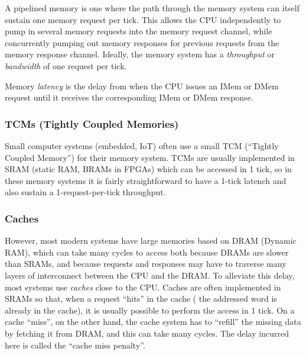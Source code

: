 A pipelined memory is one where the path through the memory system can
itself sustain one memory request per tick.  This allows the CPU
independently to pump in several memory requests into the memory
request channel, while concurrently pumping out memory responses for
previous requests from the memory response channel.  Ideally, the
memory system has a \emph{throughput} or \emph{bandwidth} of one
request per tick.

Memory \emph{latency} is the delay from when the CPU issues an IMem or
DMem request until it receives the corresponding IMem or DMem
response.


\subsubsection{TCMs (Tightly Coupled Memories)}




Small computer systems (embedded, IoT) often use a small TCM
(``Tightly Coupled Memory'') for their memory system.  TCMs are
usually implemented in SRAM (static RAM, BRAMs in FPGAs) which can be
accessed in 1 tick, so in these memory systems it is fairly
straightforward to have a 1-tick latench and also sustain a
1-request-per-tick throughput.


\subsubsection{Caches}



However, most modern systems have large memories based on DRAM
(Dynamic RAM), which can take many cycles to access both because DRAMs
are slower than SRAMs, and because requests and responses may have to
traverse many layers of interconnect between the CPU and the DRAM.  To
alleviate this delay, most systems use \emph{caches} close to the CPU.
Caches are often implemented in SRAMs so that, when a request ``hits''
in the cache ({\ie} the addressed word is already in the cache), it is
usually possible to perform the access in 1 tick.  On a cache
``miss'', on the other hand, the cache system has to ``refill'' the
missing data by fetching it from DRAM, and this can take many cycles.
The delay incurred here is called the ``cache miss penalty''.

